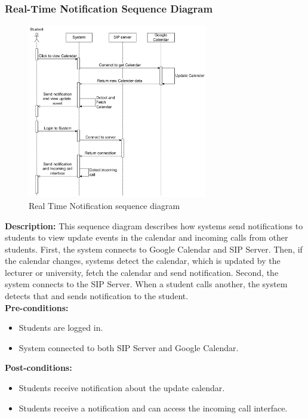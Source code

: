 \subsubsection{Real-Time Notification Sequence Diagram}
\begin{figure}[H]
    \centering
    \includegraphics[width=0.7\textwidth]{image/Real-timeNotification.pdf} 
    \caption{Real Time Notification sequence diagram}
    \label{fig:noti_sequence}
\end{figure}

\textbf{Description:} This sequence diagram describes how systems send notifications to students to view update events in the calendar and incoming calls from other students. 
First, the system connects to Google Calendar and SIP Server. 
Then, if the calendar changes, systems detect the calendar, which is updated by the lecturer or university, fetch the calendar and send notification. 
Second, the system connects to the SIP Server. When a student calls another, the system detects that and sends notification to the student. \\

\noindent \textbf{Pre-conditions:} 
    \begin{itemize}
        \item Students are logged in.
        \item System connected to both SIP Server and Google Calendar.
    \end{itemize}
\noindent \textbf{Post-conditions:}
\begin{itemize}
    \item Students receive notification about the update calendar.
    \item Students receive a notification and can access the incoming call interface.
\end{itemize}
